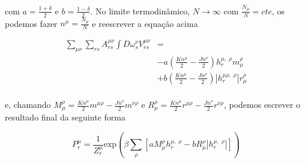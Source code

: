 \documentclass[a4paper, 11pt]{article} %
\newcommand{\agent}[2]{%
    \omega^{#2}_{#1}}
\newcommand{\pot}{\ensuremath{\displaystyle%
    V_{rs}^{\mu \nu}}}
\newcommand{\opn}[2]{\ensuremath{\displaystyle%
    h^{#2,\;\rho}_{#1}}}
\newcommand{\mh}[1]{\ensuremath{\displaystyle%
    m^{\rho}_{#1}}}
\newcommand{\rh}[1]{\ensuremath{\displaystyle%
    r^{\rho}_{#1}}}
\newcommand{\Mh}[1]{\ensuremath{\displaystyle%
    M^{\rho}_{#1}}}
\newcommand{\Rh}[1]{\ensuremath{\displaystyle%
    R^{\rho}_{#1}}}
\newcommand{\inp}[1]{\ensuremath{\displaystyle%
    \left(#1\right)}}
\newcommand{\ins}[1]{\ensuremath{\displaystyle%
    \left[#1\right]}}
\begin{document}
com $a=\frac{1+\delta}{2}$ e $b=\frac{1-\delta}{2}$. No limite termodinâmico, 
$N \to \infty$ com $\frac{N_{\mu}}{N} = \textit{cte}$,
os podemos fazer $n^{\mu} = \frac{N_{\mu}}{N}$ e reescrever a equação acima

\begin{equation}
    \begin{split}
        \sum_{\mu\nu}\sum_{rs}A^{\mu\nu}_{rs}\int D\agent{s}{\nu} \pot & = \\
        & 
        -a\inp{\frac{Kn^{\mu}}{2}-\frac{Jn^{\nu}}{2}}\opn{r}{\mu}\mh{\mu}\\
        &
        +b\inp{\frac{Kn^{\mu}}{2}-\frac{Jn^{\nu}}{2}}|
        \opn{r}{\mu\rho}|\rh{\mu}\\
    \end{split}
\end{equation}

e, chamando $\Mh{\mu} =
\frac{Kn^{\mu}}{2}m^{\mu\rho}-\frac{Jn^{\nu}}{2}m^{\nu\rho} $ e $\Rh{\mu}
= \frac{Kn^{\mu}}{2}r^{\mu\rho}-\frac{Jn^{\nu}}{2}r^{\nu\rho}$, podemos escrever
o resultado final da seguinte forma

\begin{equation}
    P_r^{\mu} = \frac{1}{Z_r^{\mu}} \mathrm{exp} \inp{%
        \beta\sum_{\rho}\ins{a\Mh{\mu}\opn{r}{\mu}-b\Rh{\mu}|\opn{r}{\mu}|}}
\end{equation}






% 

% 

\end{document}
